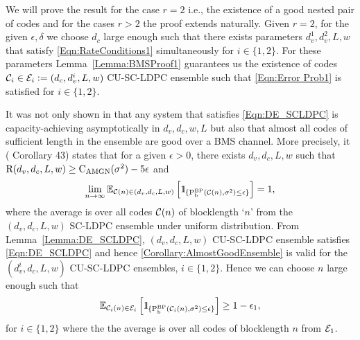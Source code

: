 \documentclass[journal,twocolumn]{IEEEtran}
\begin{document}
\begin{IEEEproof}
We will prove the result for the case $r=2$ i.e., the existence of a good nested pair of codes and for the cases $r>2$ the  proof extends naturally. Given $r=2$, for the given $\epsilon,\delta$ we choose $d_{c}$ large enough such that there exists parameters $d_{v}^{1},d_{v}^{2},L,w$ that satisfy \eqref{Eqn:RateConditions1} simultaneously for $i \in\{1,2\}$. For these parameters Lemma~\ref{Lemma:BMSProof1} guarantees us the existence of codes $\mathcal{C}_{i}\in\mathcal{E}_{i}\mathrel{\mathop:}= (d_{c},d_{v}^{i},L,w)$ CU-SC-LDPC ensemble such that \eqref{Eqn:Error Prob1} is satisfied for $i\in\{1,2\}$.

It was not only shown in \cite{kudekaruniversal} that any system that satisfies \eqref{Eqn:DE_SCLDPC} is capacity-achieving  asymptotically in $d_{v},d_{c},w,L$ but also that almost all codes of sufficient length in the ensemble are good over a BMS channel. More precisely, it (\cite{kudekaruniversal} Corollary 43) states that for a given $\epsilon >0$, there exists $d_{v},d_{c}, L,w$ such that $\text{R}(d_{v},d_{c},L,w)\geq \text{C}_{\text{AMGN}}(\sigma^{2})-5\epsilon$ and
\begin{align}
\lim_{n\rightarrow\infty}\mbb{E}_{\mc{C}(n)\in(d_{v},d_{c},L,w)}\left[ \ind_{\{\tx{P}_{\tx{b}}^{\tx{BP}}\left(\mc{C}(n),\sigma^{2}\right)\leq \epsilon\}}\right]=1,
\label{Corollary:AlmostGoodEnsemble}
\end{align}
where the average is over all codes $\mathcal{C}(n)$ of blocklength `$n$' from the $(d_{v},d_{c},L,w)$ SC-LDPC ensemble under uniform distribution. From Lemma~\ref{Lemma:DE_SCLDPC}, $(d_{v},d_{c},L,w)$ CU-SC-LDPC ensemble satisfies \eqref{Eqn:DE_SCLDPC} and hence \eqref{Corollary:AlmostGoodEnsemble} is valid for the $(d_{v}^{i},d_{c},L,w)$ CU-SC-LDPC ensembles, $i\in\{1,2\}$. Hence we can choose $n$ large enough such that 
\begin{align}
\mbb{E}_{\mc{C}_{i}(n)\in \mc{E}_{i}}\left[	 \ind_{\{\tx{P}_{\tx{b}}^{\tx{BP}}\left(\mc{C}_{i}(n),\sigma^{2}\right)\leq \epsilon\}}\right]\geq 1-\epsilon_{1},
\label{Eqn:Proof1.1}
\end{align}
for $i\in \{1,2\}$ where  the the average is over all codes of blocklength $n$ from $\mathcal{E}_{1}$.


\end{IEEEproof}
\end{document}
